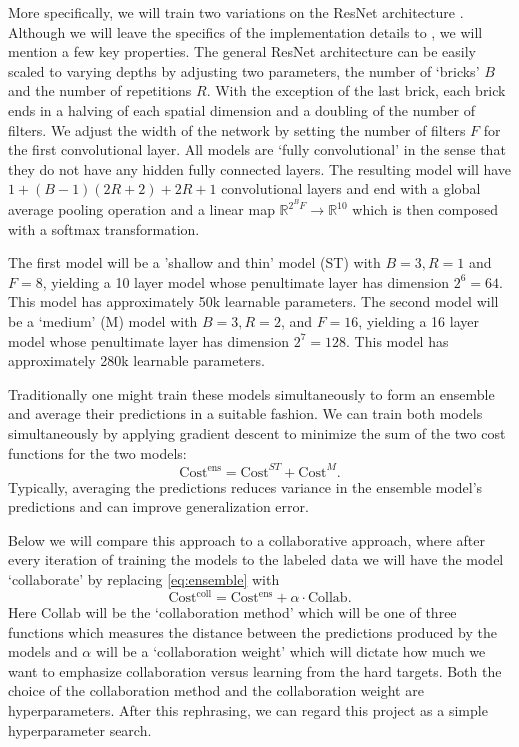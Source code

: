 \documentclass[english,a4paper,oneside]{amsart}
\theoremstyle{definition}
\begin{document}
More specifically, we will train two variations on the ResNet architecture \cite{ResNet}. Although we will leave the specifics of the implementation details to \cite{ResNet}, we will mention a few key properties. The general ResNet architecture can be easily scaled to varying depths by adjusting two parameters, the number of `bricks' $B$ and the number of repetitions $R$. With the exception of the last brick, each brick ends in a halving of each spatial dimension and a doubling of the number of filters. We adjust the width of the network by setting the number of filters $F$ for the first convolutional layer. All models are `fully convolutional' in the sense that they do not have any hidden fully connected layers. The resulting model will have $1+(B-1)(2R+2)+2R+1$ convolutional layers and end with a global average pooling operation and a linear map $\mathbb{R}^{2^B F} \to \mathbb{R}^{10}$ which is then composed with a softmax transformation. 

The first model will be a 'shallow and thin' model (ST) with $B=3, R=1$ and $F=8$, yielding a 10 layer model whose penultimate layer has dimension $2^{6}=64$.  This model has approximately 50k learnable parameters. The second model will be a `medium' (M) model with $B=3, R=2$, and $F=16$, yielding a 16 layer model whose penultimate layer has dimension $2^{7}=128$. This model has approximately 280k learnable parameters.  

Traditionally one might train these models simultaneously to form an ensemble and average their predictions in a suitable fashion. We can train both models simultaneously by applying gradient descent to minimize the sum of the two cost functions for the two models:
\begin{equation}\label{eq:ensemble}
 \mathrm{Cost^{ens}} = \mathrm{Cost}^{ST} + \mathrm{Cost}^{M}.
 \end{equation}
Typically, averaging the predictions reduces variance in the ensemble model's predictions and can improve generalization error. 

Below we will compare this approach to a collaborative approach, where after every iteration of training the models to the labeled data we will have the model `collaborate' by replacing \eqref{eq:ensemble} with 
\begin{equation}\label{eq:collab}
 \mathrm{Cost^{coll}} = \mathrm{Cost^{ens}} + \alpha \cdot \mathrm{Collab}.
\end{equation} 
Here $\mathrm{Collab}$ will be the `collaboration method' which will be one of three functions which measures the distance between the predictions produced by the models and $\alpha$ will be a `collaboration weight' which will dictate how much we want to emphasize collaboration versus learning from the hard targets. Both the choice of the collaboration method and the collaboration weight are hyperparameters. After this rephrasing, we can regard this project as a simple hyperparameter search.
\end{document}
